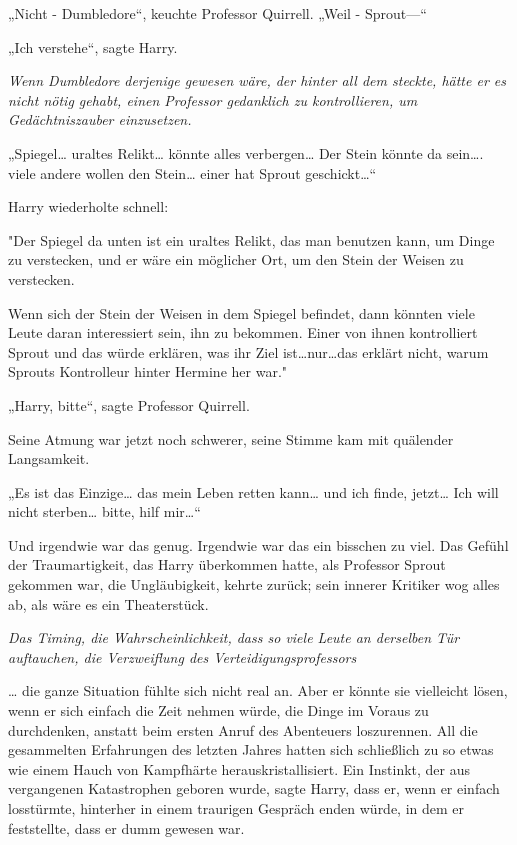 {„Nicht - Dumbledore“, keuchte Professor Quirrell. „Weil - Sprout—“

„Ich verstehe“, sagte Harry.

\emph{Wenn Dumbledore derjenige gewesen wäre, der hinter all dem steckte, hätte er es nicht nötig gehabt, einen Professor gedanklich zu kontrollieren, um Gedächtniszauber einzusetzen.}

„Spiegel… uraltes Relikt… könnte alles verbergen… Der Stein könnte da sein…. viele andere wollen den Stein… einer hat Sprout geschickt…“

Harry wiederholte schnell:

"Der Spiegel da unten ist ein uraltes Relikt, das man benutzen kann, um Dinge zu verstecken, und er wäre ein möglicher Ort, um den Stein der Weisen zu verstecken.

Wenn sich der Stein der Weisen in dem Spiegel befindet, dann könnten viele Leute daran interessiert sein, ihn zu bekommen. Einer von ihnen kontrolliert Sprout und das würde erklären, was ihr Ziel ist…nur…das erklärt nicht, warum Sprouts Kontrolleur hinter Hermine her war."

„Harry, bitte“, sagte Professor Quirrell.

Seine Atmung war jetzt noch schwerer, seine Stimme kam mit quälender Langsamkeit.

„Es ist das Einzige… das mein Leben retten kann… und ich finde, jetzt… Ich will nicht sterben… bitte, hilf mir…“

Und irgendwie war das genug. Irgendwie war das ein bisschen zu viel. Das Gefühl der Traumartigkeit, das Harry überkommen hatte, als Professor Sprout gekommen war, die Ungläubigkeit, kehrte zurück; sein innerer Kritiker wog alles ab, als wäre es ein Theaterstück.

\emph{Das Timing, die Wahrscheinlichkeit, dass so viele Leute an derselben Tür auftauchen, die Verzweiflung des Verteidigungsprofessors}

… die ganze Situation fühlte sich nicht real an. Aber er könnte sie vielleicht lösen, wenn er sich einfach die Zeit nehmen würde, die Dinge im Voraus zu durchdenken, anstatt beim ersten Anruf des Abenteuers loszurennen. All die gesammelten Erfahrungen des letzten Jahres hatten sich schließlich zu so etwas wie einem Hauch von Kampfhärte herauskristallisiert. Ein Instinkt, der aus vergangenen Katastrophen geboren wurde, sagte Harry, dass er, wenn er einfach losstürmte, hinterher in einem traurigen Gespräch enden würde, in dem er feststellte, dass er dumm gewesen war.

}

